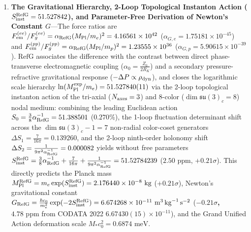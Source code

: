 \documentclass[11pt,a4paper]{article}
\newcommand{\RefG}{\mathrm{RefG}}
\begin{document}
\begin{enumerate}[label=\arabic*.]
\textbf{$\alpha_{\rm OS}^{-1}(m_Z^2) = 128.9388$} ($0.48\sigma$), and \textbf{$\hat{\alpha}_{\overline{\rm MS}}^{-1}(m_Z) = 127.9508$} (PDG $127.951 \pm 0.009$, \textbf{$0.024\sigma$}, $\Delta r = 0.03599$). Nonperturbative derivation of the $(4\pi^3, \pi^2, \pi)$ phase weights and $1/24$ Casimir residue from the 3D discrete nodal lattice spectral determinant remains a subsequent microscopic task.

\item \textbf{The Gravitational Hierarchy, 2-Loop Topological Instanton Action ($S_{\rm inst}^{\rm RefG} = \allowbreak 51.527842$), and Parameter-Free Derivation of Newton's Constant $G$}---The force ratios are $F_{\rm em}^{(ee)}/\allowbreak F_g^{(ee)} = \allowbreak \alpha_{\rm RefG}(M_{\rm Pl}/m_e)^2 = 4.16561\times 10^{42}$ ($\alpha_{G,e} = 1.75181\times 10^{-45}$) and $F_{\rm em}^{(pp)}/F_g^{(pp)} = \alpha_{\rm RefG}(M_{\rm Pl}/m_p)^2 = 1.23555\times 10^{36}$ ($\alpha_{G,p} = 5.90615\times 10^{-39}$). $\RefG$ associates the difference with the contrast between direct phase-transverse electromagnetic coupling ($\alpha_0 = \frac{Z_0}{2 R_K}$) and a secondary pressure-refractive gravitational response ($-\Delta P \propto \rho_{\rm dyn}$), and closes the logarithmic scale hierarchy $\ln(M_{\rm Pl}^{\rm exp}/m_e) = 51.527840(11)$ via the 2-loop topological instanton action of the tri-axial ($N_{\rm axes}=3$) and 8-color ($\dim\mathfrak{su}(3)_c=8$) nodal medium: combining the leading Euclidean action $S_0 = \frac{3}{8}\alpha_{\rm RefG}^{-1} = 51.388501$ ($0.270\%$), the 1-loop fluctuation determinant shift across the $\dim\mathfrak{su}(3)_c - 1 = 7$ non-radial color-coset generators $\Delta S_1 = \frac{7}{16\pi} = 0.139260$, and the 2-loop ninth-order holonomy shift $\Delta S_2 = \frac{1}{9\pi^2\alpha_{\rm RefG}^{-1}} = 0.000082$ yields without free parameters \textbf{$S_{\rm inst}^{\rm RefG} = \frac{3}{8}\alpha_{\rm RefG}^{-1} + \frac{7}{16\pi} + \frac{1}{9\pi^2\alpha_{\rm RefG}^{-1}} = 51.52784239$} (\textbf{$2.50\text{ ppm}$}, \textbf{$+0.21\sigma$}). This directly predicts the Planck mass \textbf{$M_{\rm Pl}^{\rm RefG} = m_e\exp(S_{\rm inst}^{\rm RefG}) = 2.176440\times 10^{-8}\text{ kg}$} ($+0.21\sigma$), Newton's gravitational constant \textbf{$G_{\rm RefG} = \frac{\hbar c_0}{m_e^2}\exp(-2 S_{\rm inst}^{\rm RefG}) = 6.674268\times 10^{-11}\text{ m}^3\,\text{kg}^{-1}\,\text{s}^{-2}$} (\textbf{$-0.21\sigma$, $4.78\text{ ppm}$} from CODATA 2022 $6.67430(15)\times 10^{-11}$), and the Grand Unified Action deformation scale $M_* c_0^2 = 0.6874\text{ meV}$.


\end{enumerate}
\end{document}
